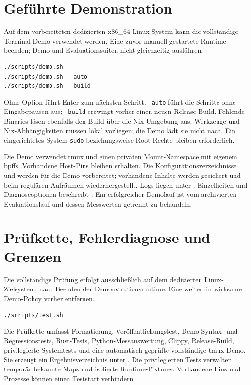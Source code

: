 \documentclass[12pt,a4paper]{article}
\begin{document}
\section{Geführte Demonstration}
Auf dem vorbereiteten dedizierten x86\_64-Linux-System kann die vollständige
Terminal-Demo verwendet werden. Eine zuvor manuell gestartete Runtime beenden;
Demo und Evaluationssuiten nicht gleichzeitig ausführen.
\begin{lstlisting}
./scripts/demo.sh
./scripts/demo.sh --auto
./scripts/demo.sh --build
\end{lstlisting}
Ohne Option führt Enter zum nächsten Schritt. \texttt{--auto} führt die Schritte
ohne Eingabepausen aus; \texttt{--build} erzwingt vorher einen neuen Release-Build.
Fehlende Binaries lösen ebenfalls den Build über die Nix-Umgebung aus.
Werkzeuge und Nix-Abhängigkeiten müssen lokal vorliegen; die Demo lädt sie nicht nach.
Ein eingerichtetes System-\texttt{sudo} beziehungsweise Root-Rechte bleiben erforderlich.

Die Demo verwendet tmux und einen privaten Mount-Namespace mit eigenem bpffs.
Vorhandene Host-Pins bleiben erhalten. Die Konfigurationsverzeichnisse und
 werden für die Demo vorbereitet; vorhandene Inhalte werden
gesichert und beim regulären Aufräumen wiederhergestellt. Logs liegen unter
. Einzelheiten und Diagnoseoptionen beschreibt
. Ein erfolgreicher Demolauf ist vom archivierten
Evaluationslauf und dessen Messwerten getrennt zu behandeln.

\section{Prüfkette, Fehlerdiagnose und Grenzen}
Die vollständige Prüfung erfolgt ausschließlich auf dem dedizierten Linux-Zielsystem,
nach Beenden der Demonstrationsruntime. Eine weiterhin wirksame Demo-Policy vorher entfernen.
\begin{lstlisting}
./scripts/test.sh
\end{lstlisting}
Die Prüfkette umfasst Formatierung, Veröffentlichungstest, Demo-Syntax- und
Regressionstests, Rust-Tests, Python-Messauswertung, Clippy, Release-Build,
privilegierte Systemtests und eine automatisch geprüfte vollständige tmux-Demo.
Sie erzeugt ein Ergebnisverzeichnis unter . Die privilegierten
Tests verwalten temporär bekannte Maps und isolierte Runtime-Fixtures. Vorhandene
Pins und Prozesse können einen Teststart verhindern.
\end{document}
